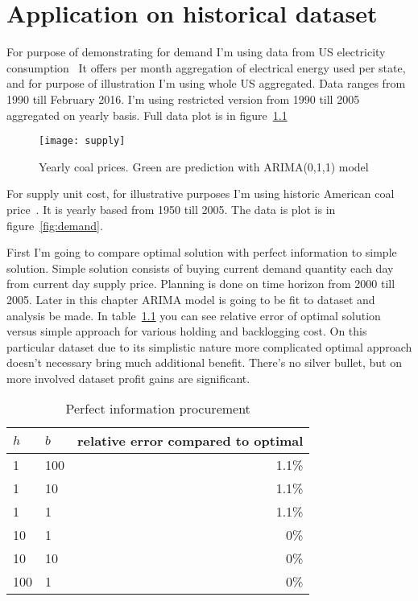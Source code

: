 
\chapter{Application on historical dataset}
\label{chap:Application on historical dataset}

For purpose of demonstrating for demand I'm using data from US electricity consumption~\autocite{us-elec} It offers per month aggregation of electrical energy used per state, and for purpose of illustration I'm using whole US aggregated. Data ranges from 1990 till February 2016. I'm using restricted version from 1990 till 2005 aggregated on yearly basis. Full data plot is in figure~\ref{fig:supply}

\begin{figure}[]
  \centering
  \texttt{[image: supply]}
  \caption{Yearly coal prices. Green are prediction with ARIMA(0,1,1) model}
  \label{fig:supply}
\end{figure}

For supply unit cost, for illustrative purposes I'm using historic American coal price~\autocite{us-coal}. It is yearly based from 1950 till 2005. The data is plot is in figure~\ref{fig:demand}.

First I'm going to compare optimal solution with perfect information to simple solution. Simple solution consists of buying current demand quantity each day from current day supply price. Planning is done on time horizon from 2000 till 2005. Later in this chapter ARIMA model is going to be fit to dataset and analysis be made. In table~\ref{my-label} you can see relative error of optimal solution versus simple approach for various holding and backlogging cost. On this particular dataset due to its simplistic nature more complicated optimal approach doesn't necessary bring much additional benefit. There's no silver bullet, but on more involved dataset profit gains are significant.

\begin{table}[]
\centering
\caption{Perfect information procurement}
\label{my-label}
\begin{tabular}{@{}llr@{}}
\toprule
$h$ & $b$ & relative error compared to optimal \\ \midrule
1   & 100 & 1.1\%          \\
1   & 10  & 1.1\%          \\
1   & 1   & 1.1\%          \\
10  & 1   & 0\%            \\
10  & 10  & 0\%            \\
100 & 1   & 0\%            \\ \bottomrule
\end{tabular}
\end{table}


